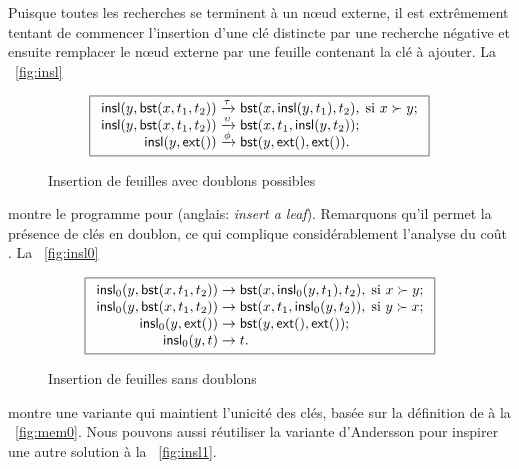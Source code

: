 Puisque toutes les recherches se terminent à un nœud externe, il
est extrêmement tentant de commencer l'insertion d'une clé distincte
par une recherche négative et ensuite remplacer le nœud externe
par une feuille contenant la clé à ajouter. La \fig~\vref{fig:insl}
\begin{figure}
\begin{equation*}
\boxed{
\begin{array}{r@{\;}l@{\;}l}
\fun{insl}(y,\fun{bst}(x,t_1,t_2)) & \xrightarrow{\smash{\tau}} &
  \fun{bst}(x,\fun{insl}(y,t_1),t_2), \; \text{si \(x \succ y\)};\\
\fun{insl}(y,\fun{bst}(x,t_1,t_2)) & \xrightarrow{\smash{\upsilon}} &
  \fun{bst}(x,t_1,\fun{insl}(y,t_2));\\
\fun{insl}(y,\fun{ext}()) & \xrightarrow{\smash{\phi}} & \fun{bst}(y,\fun{ext}(),\fun{ext}()).
\end{array}}
\end{equation*}
\caption{Insertion de feuilles avec doublons possibles}
\label{fig:insl}
\end{figure}
montre le programme pour 
(anglais: \emph{insert a leaf}). Remarquons qu'il permet la présence
de clés en doublon, ce qui complique considérablement l'analyse du
coût \citep{Burge_1976,ArchibaldClement_2006,Pasanen_2010}.  La
\fig~\vref{fig:insl0}
\begin{figure}
\begin{equation*}
\boxed{
\begin{array}{r@{\;}l@{\;}l}
\fun{insl}_0(y,\fun{bst}(x,t_1,t_2)) & \rightarrow &
  \fun{bst}(x,\fun{insl}_0(y,t_1),t_2), \; \text{si \(x \succ y\)};\\
\fun{insl}_0(y,\fun{bst}(x,t_1,t_2)) & \rightarrow &
  \fun{bst}(x,t_1,\fun{insl}_0(y,t_2)) , \; \text{si \(y \succ x\)};\\
\fun{insl}_0(y,\fun{ext}()) & \rightarrow &
\fun{bst}(y,\fun{ext}(),\fun{ext}());\\
\fun{insl}_0(y,t) & \rightarrow & t.
\end{array}}
\end{equation*}
\caption{Insertion de feuilles sans doublons}
\label{fig:insl0}
\end{figure}
montre une variante qui maintient l'unicité des clés, basée sur la
définition de  à la
\fig~\vref{fig:mem0}. Nous pouvons aussi réutiliser la variante
d'Andersson pour inspirer une autre solution à la
\fig~\vref{fig:insl1}.
